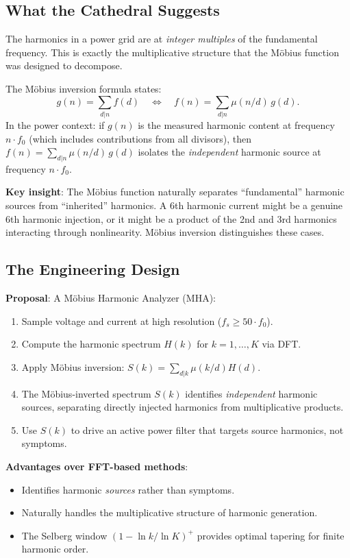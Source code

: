 \documentclass[11pt,a4paper]{article}
\begin{document}
\subsection{What the Cathedral Suggests}

The harmonics in a power grid are at \emph{integer multiples} of the
fundamental frequency. This is exactly the multiplicative structure
that the M\"obius function was designed to decompose.

The M\"obius inversion formula states:
\[
  g(n) = \sum_{d | n} f(d) \quad\iff\quad
  f(n) = \sum_{d | n} \mu(n/d)\,g(d).
\]
In the power context: if $g(n)$ is the measured harmonic content at
frequency $n \cdot f_0$ (which includes contributions from all
divisors), then $f(n) = \sum_{d|n} \mu(n/d)\,g(d)$ isolates the
\emph{independent} harmonic source at frequency $n \cdot f_0$.

\textbf{Key insight}: The M\"obius function naturally separates
``fundamental'' harmonic sources from ``inherited'' harmonics. A
6th harmonic current might be a genuine 6th harmonic injection, or
it might be a product of the 2nd and 3rd harmonics interacting
through nonlinearity. M\"obius inversion distinguishes these cases.

\subsection{The Engineering Design}

\textbf{Proposal}: A M\"obius Harmonic Analyzer (MHA):

\begin{enumerate}
  \item Sample voltage and current at high resolution
    ($f_s \geq 50 \cdot f_0$).
  \item Compute the harmonic spectrum $H(k)$ for $k = 1, \ldots, K$
    via DFT.
  \item Apply M\"obius inversion: $S(k) = \sum_{d|k} \mu(k/d) H(d)$.
  \item The M\"obius-inverted spectrum $S(k)$ identifies
    \emph{independent} harmonic sources, separating directly injected
    harmonics from multiplicative products.
  \item Use $S(k)$ to drive an active power filter that targets
    source harmonics, not symptoms.
\end{enumerate}

\textbf{Advantages over FFT-based methods}:
\begin{itemize}
  \item Identifies harmonic \emph{sources} rather than symptoms.
  \item Naturally handles the multiplicative structure of harmonic
    generation.
  \item The Selberg window $(1 - \ln k / \ln K)^+$ provides
    optimal tapering for finite harmonic order.
\end{itemize}
\end{document}
